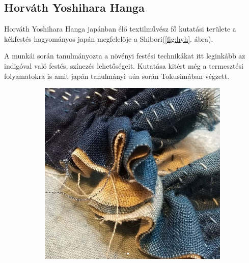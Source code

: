 \documentclass[fontsize=12pt, appendixprefix=true]{scrreprt}
\begin{document}
\subsection{Horváth Yoshihara Hanga} 
Horváth Yoshihara Hanga japánban élő textilművész fő kutatási területe \cite{hanga2010} a kékfestés hagyományos japán megfelelője a Shibori(\ref{fig:hyh}. ábra).

A munkái során tanulmányozta a növényi festési technikákat itt leginkább az indigóval való festés, színezés lehetőségeit. Kutatása kitért még a termesztési folyamatokra is amit japán tanulmányi uúa során Tokusimában végzett.

\begin{figure}[h!]
	\centering
	\begin{subfigure}[b]{0.3\linewidth}
	  \includegraphics[width=\linewidth]{img/hh_01.png}
	  \caption{}
	\end{subfigure}
	\begin{subfigure}[b]{0.3\linewidth}

\end{subfigure}
\end{figure}
\end{document}
